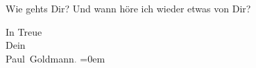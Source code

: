 \pstart
           Wie gehts Dir? Und wann höre ich wieder etwas von Dir?\pend
           
\pstart
           In Treue{\\[\baselineskip]}Dein{\\[\baselineskip]}\spacefill\mbox{Paul Goldmann\textcolor{gray}{.}}\pend
           \leftskip=0em{}\endnumbering{}  \newcommand{\dateiname}{L02624}\newcommand{\titel}{Paul Goldmann an Arthur Schnitzler, 4. 12. 1894}\newcommand{\editorInnen}{Martin Anton Müller und Laura Untner}
